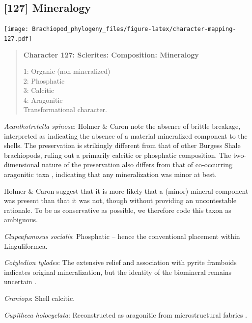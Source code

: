 \documentclass[openany]{book}
\begin{document}
\subsection*{{[}127{]} Mineralogy}\label{mineralogy}

\texttt{[image: Brachiopod\_phylogeny\_files/figure-latex/character-mapping-127.pdf]}

\begin{quote}
\textbf{Character 127: Sclerites: Composition: Mineralogy}

1: Organic (non-mineralized)\\
2: Phosphatic\\
3: Calcitic\\
4: Aragonitic\\
Transformational character.
\end{quote}

\hypertarget{Acanthotretella_spinosa-coding-127}{}
\emph{Acanthotretella spinosa}: Holmer \& Caron
\citeyearpar{Holmer2006Aspinose} note the absence of brittle breakage,
interpreted as indicating the absence of a material mineralized
component to the shells. The preservation is strikingly different from
that of other Burgess Shale brachiopods, ruling out a primarily calcitic
or phosphatic composition. The two-dimensional nature of the
preservation also differs from that of co-occurring aragonitic taxa
\citep[hyoliths;][ p.~273]{Holmer2006Aspinose}, indicating that any
mineralization was minor at best.

Holmer \& Caron \citeyearpar[p.~286]{Holmer2006Aspinose} suggest that it
is more likely that a (minor) mineral component was present than that it
was not, though without providing an uncontestable rationale. To be as
conservative as possible, we therefore code this taxon as ambiguous.

\hypertarget{Clupeafumosus_socialis-coding-127}{}
\emph{Clupeafumosus socialis}: Phosphatic -- hence the conventional
placement within Linguliformea.

\hypertarget{Cotyledion_tylodes-coding-127}{}
\emph{Cotyledion tylodes}: The extensive relief and association with
pyrite framboids indicates original mineralization, but the identity of
the biomineral remains uncertain \citep{Zhang2013}.

\hypertarget{Craniops-coding-127}{}
\emph{Craniops}: Shell calcitic.

\hypertarget{Cupitheca_holocyclata-coding-127}{}
\emph{Cupitheca holocyclata}: Reconstructed as aragonitic from
microstructural fabrics \citep{Vendrasco2017}.
\end{document}
